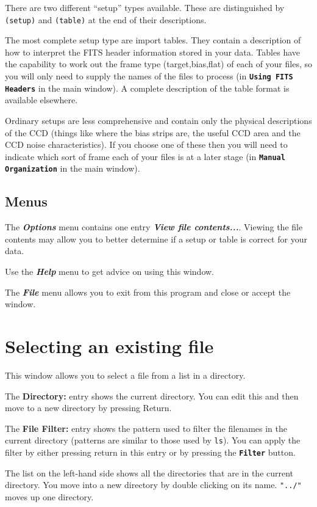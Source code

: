 \documentclass[11pt]{article}
\newcommand{\xref}[3]{#1}
\newcommand{\xlabel}[1]{}
\newcommand{\butt}[1]{{\bf \tt #1}}
\newcommand{\menu}[1]{{\bf \em #1}}
\newcommand{\wlab}[1]{{\bf #1}}
\newcommand{\text}[1]{{\tt #1}}
\begin{document}
There are two different ``setup'' types available. These are
distinguished by \text{(setup)} and \text{(table)} at the end of their
descriptions.

The most complete setup type are import tables. They contain a
description of how to interpret the FITS header information stored in
your data. Tables have the capability to work out the frame type
(target,bias,flat) of each of your files, so you will only need to
supply the names of the files to process (in \butt{Using FITS Headers}
in the main window). A complete description of the
\xref{table format}{sun139}{TableFormat} is available elsewhere.

Ordinary setups are less comprehensive and contain only the physical
descriptions of the CCD (things like where the bias strips are, the
useful CCD area and the CCD noise characteristics). If you choose one
of these then you will need to indicate which sort of frame each of
your files is at a later stage (in \butt{Manual Organization} in the
main window).

\subsection{Menus \xlabel{CCDSetDetectorMenu}}

The \menu{Options} menu contains one entry \menu{View file
contents...}. Viewing the file contents may allow you to better
determine if a setup or table is correct for your data.

Use the \menu{Help} menu to get advice on using this window.

The \menu{File} menu allows you to exit from this program and close or
accept the window.

\section{Selecting an existing file \xlabel{CCDGetFileNameWindow}}
This window allows you to select a file from a list in a directory.

The \wlab{Directory:} entry shows the current directory. You can edit this
and then move to a new directory by pressing Return.

The \wlab{File Filter:} entry shows the pattern used to filter the
filenames in the current directory (patterns are similar to those used
by \text{ls}). You can apply the filter by either pressing return in
this entry or by pressing the \butt{Filter} button.

The list on the left-hand side shows all the directories that are in
the current directory. You move into a new directory by double
clicking on its name. \text{"../"} moves up one directory.
\end{document}

